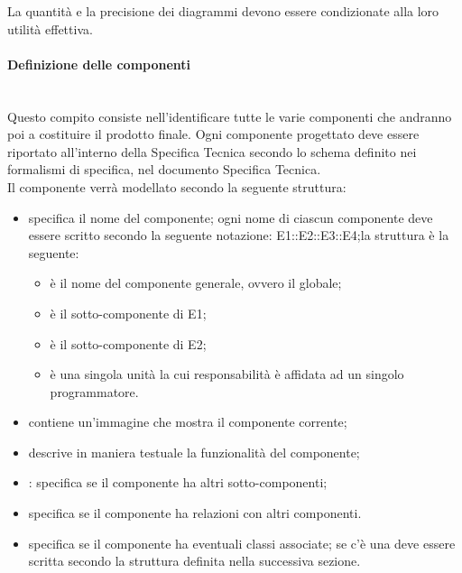 La quantità e la precisione dei diagrammi devono essere condizionate alla loro utilità effettiva.

\paragraph{Definizione delle componenti} \hfill \\
Questo compito consiste nell'identificare tutte le varie componenti che andranno poi a costituire il prodotto finale.
Ogni componente progettato deve essere riportato all'interno della Specifica Tecnica secondo lo schema definito nei formalismi di specifica, nel documento Specifica Tecnica. \\
Il componente verrà modellato secondo la seguente struttura:
\begin{itemize}
\item {}specifica il nome del componente; ogni nome di ciascun componente deve essere scritto secondo la seguente notazione: E1::E2::E3::E4;la struttura è la seguente:
\begin{itemize}
\item {}è il nome del componente generale, ovvero il  globale;
\item {}è il sotto-componente di E1;
\item {}è il sotto-componente di E2;
\item {}è una singola unità la cui responsabilità è affidata ad un singolo programmatore.
\end{itemize}
\item {}contiene un'immagine che mostra il componente corrente;
\item {}descrive in maniera testuale la funzionalità del componente;
\item {}: specifica se il componente ha altri sotto-componenti;
\item {} specifica se il componente ha relazioni con altri componenti.
\item {}specifica se il componente ha eventuali classi associate; se c'è una  deve essere scritta secondo la struttura definita nella successiva sezione.
\end{itemize}

